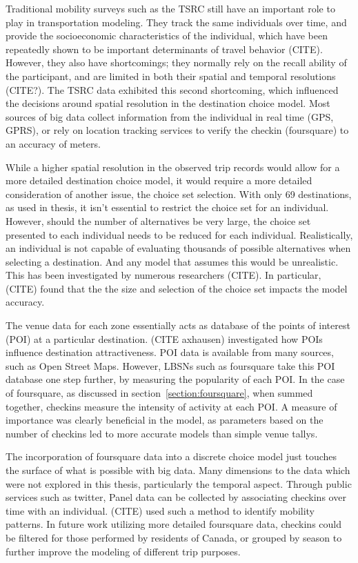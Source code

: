 Traditional mobility surveys such as the TSRC still have an important role to play in transportation modeling. They track the same individuals over time, and provide the socioeconomic characteristics of the individual, which have been repeatedly shown to be important determinants of travel behavior (CITE). However, they also have shortcomings; they normally rely on the recall ability of the participant, and are limited in both their spatial and temporal resolutions (CITE?). The TSRC data exhibited this second shortcoming, which influenced the decisions around spatial resolution in the destination choice model. Most sources of big data collect information from the individual in real time (GPS, GPRS), or rely on location tracking services to verify the checkin (foursquare) to an accuracy of meters.

While a higher spatial resolution in the observed trip records would allow for a more detailed destination choice model, it would require a more detailed consideration of another issue, the choice set selection. With only 69 destinations, as used in thesis, it isn't essential to restrict the choice set for an individual. However, should the number of alternatives be very large, the choice set presented to each individual needs to be reduced for each individual. Realistically, an individual is not capable of evaluating thousands of possible alternatives when selecting a destination. And any model that assumes this would be unrealistic. This has been investigated by numerous researchers (CITE). In particular, (CITE) found that the the size and selection of the choice set impacts the model accuracy.

The venue data for each zone essentially acts as database of the points of interest (POI) at a particular destination. (CITE axhausen) investigated how POIs influence destination attractiveness. POI data is available from many sources, such as Open Street Maps. However, LBSNs such as foursquare take this POI database one step further, by measuring the popularity of each POI. In the case of foursquare, as discussed in section~\ref{section:foursquare}, when summed together, checkins measure the intensity of activity at each POI. A measure of importance was clearly beneficial in the model, as parameters based on the number of checkins led to more accurate models than simple venue tallys.

The incorporation of foursquare data into a discrete choice model just touches the surface of what is possible with big data. 
Many dimensions to the data which were not explored in this thesis,  particularly the temporal aspect. Through public services such as twitter, Panel data can be collected by associating checkins over time with an individual. (CITE) used such a method to identify mobility patterns. In future work utilizing more detailed foursquare data, checkins could be filtered for those performed by residents of Canada, or grouped by season to further improve the modeling of different trip purposes.

